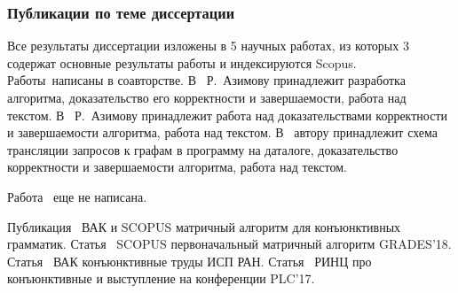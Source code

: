 \subsubsection*{\large{Публикации по теме диссертации}}
 Все результаты диссертации изложены в 5 научных работах, из которых 3~\cite{1,2,3,4,5} содержат основные результаты работы и индексируются Scopus. Работы~\cite{1,2,3,4}написаны в соавторстве. В~\cite{1} Р.~Азимову принадлежит разработка алгоритма, доказательство его корректности и завершаемости, работа над текстом. В~\cite{2,4} Р.~Азимову принадлежит работа над доказательствами корректности и завершаемости алгоритма, работа над текстом. В~\cite{3} автору принадлежит схема трансляции запросов к графам в программу на даталоге, доказательство корректности и завершаемости алгоритма, работа над текстом.
 
 Работа~\cite{5} еще не написана.
 
 Публикация~\cite{6} ВАК и SCOPUS матричный алгоритм для конъюнктивных грамматик. Статья~\cite{7} SCOPUS первоначальный матричный алгоритм GRADES'18. Статья~\cite{8} ВАК конъюнктивные труды ИСП РАН. Статья~\cite{9} РИНЦ про конъюнктивные и выступление на конференции PLC'17.






